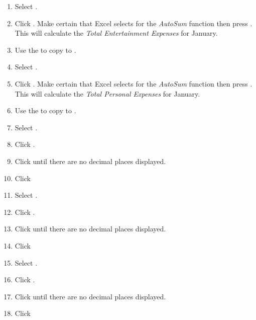 \begin{enumerate}
	\item Select .
	\item Click . Make certain that Excel selects  for the \textit{AutoSum} function then press . This will calculate the \textit{Total Entertainment Expenses} for January.
	\item Use the  to copy  to .

	\item Select .
	\item Click . Make certain that Excel selects  for the \textit{AutoSum} function then press . This will calculate the \textit{Total Personal Expenses} for January.
	\item Use the  to copy  to .
	
	\item Select .
	\item Click .
	\item Click  until there are no decimal places displayed.
	\item Click  
	
	\item Select .
	\item Click .
	\item Click  until there are no decimal places displayed.
	\item Click  

	\item Select .
	\item Click .
	\item Click  until there are no decimal places displayed.
	\item Click  


\end{enumerate}

